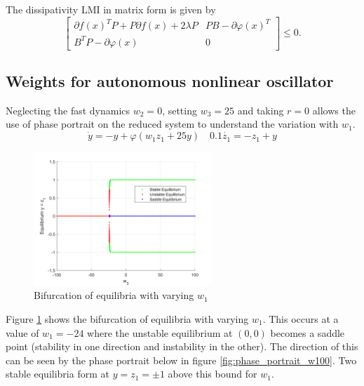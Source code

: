 \documentclass{article}
\begin{document}
The dissipativity LMI in matrix form is given by
\begin{equation}    
\left[
\begin{array}{cc}
\partial f(x)^T P + P \partial f(x) + 2\lambda P & PB - \partial \varphi(x)^T \\
B^T P - \partial \varphi(x) & 0
\end{array}
\right] \leq 0.
\end{equation}

\subsection{Weights for autonomous nonlinear oscillator}
Neglecting the fast dynamics $w_2 = 0$, setting $w_3 = 25$ and taking $r = 0$ allows the
use of phase portrait on the reduced system to understand the variation with $w_1$.
\begin{equation}
    \dot{y} = -y + \varphi(w_1z_1 + 25y) \quad 0.1 \dot{z_1} = -z_1 + y
\end{equation}

\begin{figure}[H]
    \centering
    \includegraphics[width=0.6\textwidth]{figures/equilibria_bifurcation.png}
    \caption{Bifurcation of equilibria with varying $w_1$}
    \label{fig:equilibria}
\end{figure}

Figure \ref{fig:equilibria} shows the bifurcation of equilibria with varying $w_1$.
This occurs at a value of $w_1 = -24$ where the unstable equilibrium at $(0,0)$ becomes a saddle point (stability in one direction and instability in the other).
The direction of this can be seen by the phase portrait below in figure \ref{fig:phase_portrait_w100}.
Two stable equilibria form at $y = z_1 = \pm 1$ above this bound for $w_1$.
\end{document}
